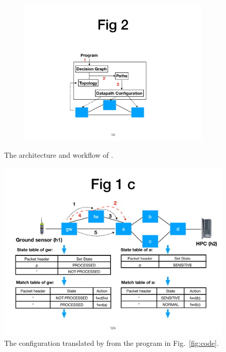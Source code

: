 \begin{figure}[!htbp]
\centering
\begin{subfigure}{0.4\linewidth}
      \centering\includegraphics[width=\linewidth]{figures/ss-125.pdf}
\end{subfigure}
\caption{\small The architecture and workflow of \concept{}.}
\label{fig:system-workflow}
\end{figure}

\begin{figure}[!htbp]
\centering
      \centering\includegraphics[width=0.8\linewidth]{figures/ss-124.pdf}
	\caption{\small The configuration translated by \concept{} from the
	program in Fig.~\ref{fig:code}.}
\label{fig:dsdc-result}
\end{figure}


